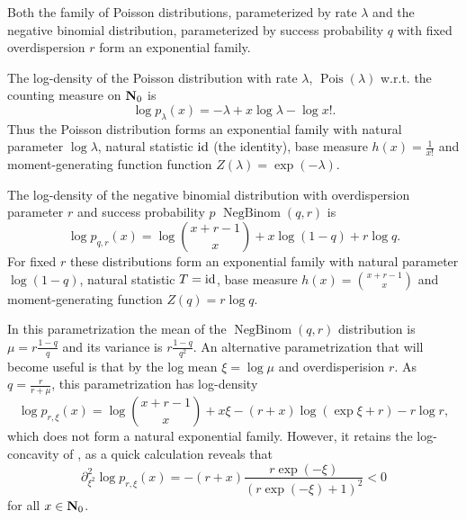 \begin{example}
    \label{ex:pois_negbinom}
    Both the family of Poisson distributions, parameterized by rate $\lambda$ and the negative binomial distribution, parameterized by success probability $q$ with fixed overdispersion $r$ form an exponential family.

    The log-density of the Poisson distribution with rate $\lambda$, $\operatorname{Pois} (\lambda)$ w.r.t. the counting measure on $\mathbf N_{0}$ is 
    $$
    \log p_{\lambda} (x) = -\lambda + x\log \lambda - \log x!.
    $$
    Thus the Poisson distribution forms an exponential family with natural parameter $\log \lambda$, natural statistic $\operatorname{id}$ (the identity), base measure $h(x) = \frac{1}{x!}$ and moment-generating function function $Z(\lambda) = \exp \left( -\lambda \right)$. 

    The log-density of the negative binomial distribution with overdispersion parameter $r$ and success probability $p$ $\operatorname{NegBinom} \left( q, r \right)$ is 
    $$
    \log p_{q,r}(x) = \log \binom{x + r - 1}{x} + x \log (1 - q) + r \log q.
    $$
    For fixed $r$ these distributions form an exponential family with natural parameter $\log (1 - q )$, natural statistic $T = \operatorname{id}$, base measure $h(x) = \binom{x + r - 1}{x}$ and moment-generating function $Z(q) = r \log q$. 

    In this parametrization the mean of the $\operatorname{NegBinom}(q,r)$ distribution is $\mu = r \frac{1 - q}{q}$ and its variance is $r \frac{1 - q}{q^{2}}$. An alternative parametrization that will become useful  is that by the log mean $\xi = \log \mu$ and overdisperision $r$. As $q = \frac{r}{r + \mu}$, this parametrization has log-density
    $$
    \log p_{r,\xi}(x) = \log \binom{x + r - 1}{x} + x \xi  - (r + x) \log (\exp \xi + r) - r \log r,
    $$
    which does not form a natural exponential family. However, it retains the log-concavity of , as a quick calculation reveals that 
    $$
    \partial_{\xi^{2}}^{2} \log p_{r,\xi} (x) = -(r + x) \frac{r \exp (-\xi)}{(r \exp (-\xi) + 1)^{2}} < 0
    $$
    for all $x \in \mathbf N_{0}$. 
\end{example}


